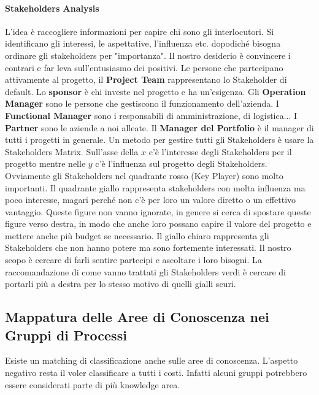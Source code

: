 \paragraph{Stakeholders Analysis}
L'idea è raccogliere informazioni per capire chi sono gli interlocutori. Si identificano gli interessi, le aspettative, l'influenza etc. dopodiché bisogna ordinare gli stakeholders per "importanza". Il nostro desiderio è convincere i contrari e far leva sull'entusiasmo dei positivi.
\noindent Le persone che partecipano attivamente al progetto, il \textbf{Project Team} rappresentano lo Stakeholder di default. Lo \textbf{sponsor} è chi investe nel progetto e ha un'esigenza. Gli \textbf{Operation Manager} sono le persone che gestiscono il funzionamento dell'azienda. I \textbf{Functional Manager} sono i responsabili di amministrazione, di logistica... I \textbf{Partner} sono le aziende a noi alleate. Il \textbf{Manager del Portfolio} è il manager di tutti i progetti in generale.\newline
Un metodo per gestire tutti gli Stakeholders è usare la Stakeholders Matrix. Sull'asse della $x$ c'è l'interesse degli Stakeholders per il progetto mentre nelle $y$ c'è l'influenza sul progetto degli Stakeholders. Ovviamente gli Stakeholders nel quadrante rosso (Key Player) sono molto importanti. Il quadrante giallo rappresenta stakeholders con molta influenza ma poco interesse, magari perché non c'è per loro un valore diretto o un effettivo vantaggio. Queste figure non vanno ignorate, in genere si cerca di spostare queste figure verso destra, in modo che anche loro possano capire il valore del progetto e mettere anche più budget se necessario.\newline
Il giallo chiaro rappresenta gli Stakeholders che non hanno potere ma sono fortemente interessati. Il nostro scopo è cercare di farli sentire partecipi e ascoltare i loro bisogni. La raccomandazione di come vanno trattati gli Stakeholders verdi è cercare di portarli più a destra per lo stesso motivo di quelli gialli scuri.
\subsection{Mappatura delle Aree di Conoscenza nei Gruppi di Processi}
Esiste un matching di classificazione anche sulle aree di conoscenza. L'aspetto negativo resta il voler classificare a tutti i costi. Infatti alcuni gruppi potrebbero essere considerati parte di più knowledge area.
